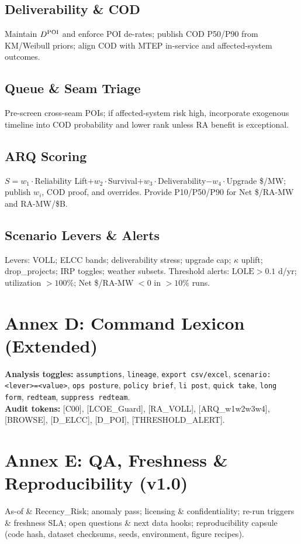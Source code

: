 \documentclass[11pt]{article}
\newcommand{\LOLE}{\ensuremath{\mathrm{LOLE}}}
\numberwithin{equation}{section}
\theoremstyle{definition}
\theoremstyle{remark}
\begin{document}
\subsection*{Deliverability \& COD}
Maintain $\Ddel$ and enforce POI de-rates; publish COD P50/P90 from KM/Weibull priors; align COD with MTEP in-service and affected-system outcomes.

\subsection*{Queue \& Seam Triage}
Pre-screen cross-seam POIs; if affected-system risk high, incorporate exogenous timeline into COD probability and lower rank unless RA benefit is exceptional.

\subsection*{ARQ Scoring}
$S=w_1\cdot$Reliability Lift$+w_2\cdot$Survival$+w_3\cdot$Deliverability$-w_4\cdot$Upgrade \$/MW; publish $w_i$, COD proof, and overrides. Provide P10/P50/P90 for Net \$/RA-MW and RA-MW/\$B.


\subsection*{Scenario Levers \& Alerts}
Levers: VOLL; ELCC bands; deliverability stress; upgrade cap; $\kappa$ uplift; drop\_projects; IRP toggles; weather subsets. Threshold alerts: $\LOLE>0.1$ d/yr; utilization $>100\%$; Net \$/RA-MW $<0$ in $>10\%$ runs.


\section{Annex D: Command Lexicon (Extended)}
\textbf{Analysis toggles:} \texttt{assumptions}, \texttt{lineage}, \texttt{export csv/excel}, \texttt{scenario: <lever>=<value>}, \texttt{ops posture}, \texttt{policy brief}, \texttt{li post}, \texttt{quick take}, \texttt{long form}, \texttt{redteam}, \texttt{suppress redteam}. \\
\textbf{Audit tokens:} [C00], [LCOE\_Guard], [RA\_VOLL], [ARQ\_w1w2w3w4], [BROWSE], [D\_ELCC], [D\_POI], [THRESHOLD\_ALERT].

\section{Annex E: QA, Freshness \& Reproducibility (v1.0)}
As-of \& Recency\_Risk; anomaly pass; licensing \& confidentiality; re-run triggers \& freshness SLA; open questions \& next data hooks; reproducibility capsule (code hash, dataset checksums, seeds, environment, figure recipes).
\end{document}
